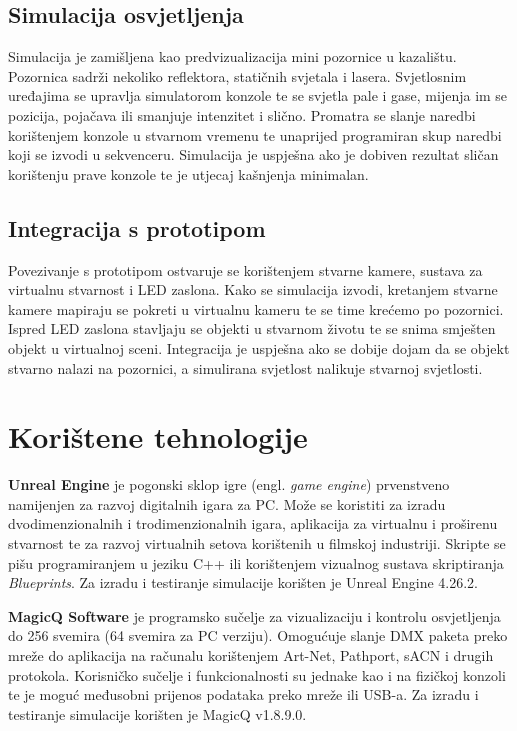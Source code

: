 \documentclass[times, utf8, zavrsni, numeric]{fer}
\begin{document}
\section{Simulacija osvjetljenja}
Simulacija je zamišljena kao predvizualizacija mini pozornice u kazalištu. Pozornica sadrži nekoliko reflektora, statičnih svjetala i lasera. Svjetlosnim uređajima se upravlja simulatorom konzole te se svjetla pale i gase, mijenja im se pozicija, pojačava ili smanjuje intenzitet i slično. Promatra se slanje naredbi korištenjem konzole u stvarnom vremenu te unaprijed programiran skup naredbi koji se izvodi u sekvenceru. Simulacija je uspješna ako je dobiven rezultat sličan korištenju prave konzole te je utjecaj kašnjenja minimalan.

\section{Integracija s prototipom}
Povezivanje s prototipom ostvaruje se korištenjem stvarne kamere, sustava za virtualnu stvarnost i LED zaslona. Kako se simulacija izvodi, kretanjem stvarne kamere mapiraju se pokreti u virtualnu kameru te se time krećemo po pozornici. Ispred LED zaslona stavljaju se objekti u stvarnom životu te se snima smješten objekt u virtualnoj sceni. Integracija je uspješna ako se dobije dojam da se objekt stvarno nalazi na pozornici, a simulirana svjetlost nalikuje stvarnoj svjetlosti.

\chapter{Korištene tehnologije}
\textbf{Unreal Engine} \cite{Unreal_Engine} je pogonski sklop igre (engl. \emph{game engine}) prvenstveno namijenjen za razvoj digitalnih igara za PC. Može se koristiti za izradu dvodimenzionalnih i trodimenzionalnih igara, aplikacija za virtualnu i proširenu stvarnost te za razvoj virtualnih setova korištenih u filmskoj industriji. Skripte se pišu programiranjem u jeziku C++ ili korištenjem vizualnog sustava skriptiranja \emph{Blueprints}. 
Za izradu i testiranje simulacije korišten je Unreal Engine 4.26.2. \newline

\textbf{MagicQ Software} \cite{MagicQ_Software} je programsko sučelje za vizualizaciju i kontrolu osvjetljenja do 256 svemira (64 svemira za PC verziju). Omogućuje slanje DMX paketa preko mreže do aplikacija na računalu korištenjem Art-Net, Pathport, sACN i drugih protokola. Korisničko sučelje i funkcionalnosti su jednake kao i na fizičkoj konzoli te je moguć međusobni prijenos podataka preko mreže ili USB-a. 
Za izradu i  testiranje simulacije korišten je MagicQ v1.8.9.0. \newline
\end{document}
